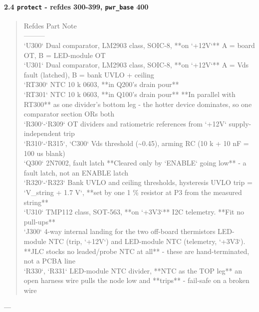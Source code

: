 \documentclass[11pt,a4paper]{article}
\begin{document}
\paragraph*{2.4 \texttt{protect} - refdes 300-399, \texttt{pwr\_base} 400}
\begin{quote}\small\ttfamily\raggedright
\textbar{} Refdes \textbar{} Part \textbar{} Note \textbar{}\\
\textbar{}---\textbar{}---\textbar{}---\textbar{}\\
\textbar{} `U300` \textbar{} Dual comparator, LM2903 class, SOIC-8, {*}{*}on `+12V`{*}{*} \textbar{} A = board OT, B = LED-module OT \textbar{}\\
\textbar{} `U301` \textbar{} Dual comparator, LM2903 class, SOIC-8, {*}{*}on `+12V`{*}{*} \textbar{} A = Vds fault (latched), B = bank UVLO + ceiling \textbar{}\\
\textbar{} `RT300` \textbar{} NTC 10 k 0603, {*}{*}in Q200's drain pour{*}{*} \textbar{} \textbar{}\\
\textbar{} `RT301` \textbar{} NTC 10 k 0603, {*}{*}in Q100's drain pour{*}{*} \textbar{} {*}{*}In parallel with RT300{*}{*} as one divider's bottom leg - the hotter device dominates, so one comparator section ORs both \textbar{}\\
\textbar{} `R300`-`R309` \textbar{} OT dividers and ratiometric references from `+12V` \textbar{} supply-independent trip \textbar{}\\
\textbar{} `R310`-`R315`, `C300` \textbar{} Vds threshold (\textasciitilde{}0.45), arming RC (10 k + 10 nF = 100 us blank) \textbar{} \textbar{}\\
\textbar{} `Q300` \textbar{} 2N7002, fault latch \textbar{} {*}{*}Cleared only by `ENABLE` going low{*}{*} - a fault latch, not an ENABLE latch \textbar{}\\
\textbar{} `R320`-`R323` \textbar{} Bank UVLO and ceiling thresholds, hysteresis \textbar{} UVLO trip = `V\_string + 1.7 V`, {*}{*}set by one 1 \% resistor at P3 from the measured string{*}{*} \textbar{}\\
\textbar{} `U310` \textbar{} TMP112 class, SOT-563, {*}{*}on `+3V3`{*}{*} \textbar{} I2C telemetry. {*}{*}Fit no pull-ups{*}{*} \textbar{}\\
\textbar{} `J300` \textbar{} 4-way internal landing for the two off-board thermistors \textbar{} LED-module NTC (trip, `+12V`) and LED-module NTC (telemetry, `+3V3`). {*}{*}JLC stocks no leaded/probe NTC at all{*}{*} - these are hand-terminated, not a PCBA line \textbar{}\\
\textbar{} `R330`, `R331` \textbar{} LED-module NTC divider, {*}{*}NTC as the TOP leg{*}{*} \textbar{} an open harness wire pulls the node low and {*}{*}trips{*}{*} - fail-safe on a broken wire \textbar{}
\end{quote}
---
\end{document}

